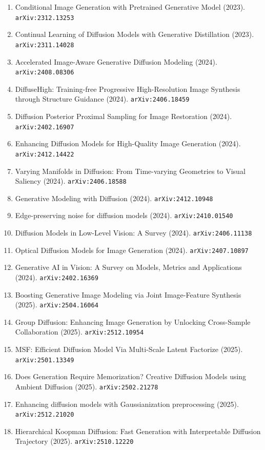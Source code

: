 \documentclass[11pt]{article}
\begin{document}
\begin{enumerate}
  \item Conditional Image Generation with Pretrained Generative Model (2023). \texttt{arXiv:2312.13253}
  \item Continual Learning of Diffusion Models with Generative Distillation (2023). \texttt{arXiv:2311.14028}
  \item Accelerated Image-Aware Generative Diffusion Modeling (2024). \texttt{arXiv:2408.08306}
  \item DiffuseHigh: Training-free Progressive High-Resolution Image Synthesis
  through Structure Guidance (2024). \texttt{arXiv:2406.18459}
  \item Diffusion Posterior Proximal Sampling for Image Restoration (2024). \texttt{arXiv:2402.16907}
  \item Enhancing Diffusion Models for High-Quality Image Generation (2024). \texttt{arXiv:2412.14422}
  \item Varying Manifolds in Diffusion: From Time-varying Geometries to Visual
  Saliency (2024). \texttt{arXiv:2406.18588}
  \item Generative Modeling with Diffusion (2024). \texttt{arXiv:2412.10948}
  \item Edge-preserving noise for diffusion models (2024). \texttt{arXiv:2410.01540}
  \item Diffusion Models in Low-Level Vision: A Survey (2024). \texttt{arXiv:2406.11138}
  \item Optical Diffusion Models for Image Generation (2024). \texttt{arXiv:2407.10897}
  \item Generative AI in Vision: A Survey on Models, Metrics and Applications (2024). \texttt{arXiv:2402.16369}
  \item Boosting Generative Image Modeling via Joint Image-Feature Synthesis (2025). \texttt{arXiv:2504.16064}
  \item Group Diffusion: Enhancing Image Generation by Unlocking Cross-Sample Collaboration (2025). \texttt{arXiv:2512.10954}
  \item MSF: Efficient Diffusion Model Via Multi-Scale Latent Factorize (2025). \texttt{arXiv:2501.13349}
  \item Does Generation Require Memorization? Creative Diffusion Models using Ambient Diffusion (2025). \texttt{arXiv:2502.21278}
  \item Enhancing diffusion models with Gaussianization preprocessing (2025). \texttt{arXiv:2512.21020}
  \item Hierarchical Koopman Diffusion: Fast Generation with Interpretable Diffusion Trajectory (2025). \texttt{arXiv:2510.12220}

\end{enumerate}
\end{document}
